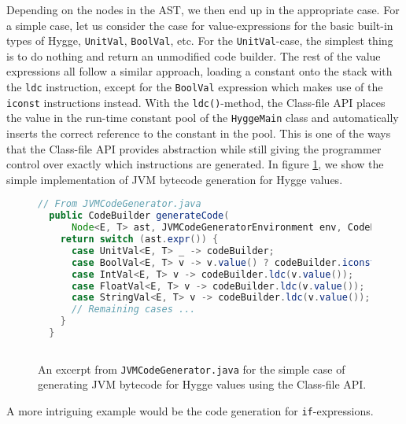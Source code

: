 Depending on the nodes in the AST, we then end up in the appropriate case. For a simple case, let us consider the case
for value-expressions for the basic built-in types of Hygge, \texttt{UnitVal}, \texttt{BoolVal}, etc. For the \texttt{UnitVal}-case,
the simplest thing is to do nothing and return an unmodified code builder. The rest of the value expressions all follow a similar approach,
loading a constant onto the stack with the \texttt{ldc} instruction, except for the \texttt{BoolVal} expression which makes use of the
\texttt{iconst} instructions instead. With the \texttt{ldc()}-method, the Class-file API places the value in the run-time constant pool
of the \texttt{HyggeMain} class and automatically inserts the correct reference to the constant in the pool. This is one of the ways
that the Class-file API provides abstraction while still giving the programmer control over exactly which instructions are generated.
In figure \ref{fig:jvm_value_codegen}, we show the
simple implementation of JVM bytecode generation for Hygge values.

\begin{figure}[H]
\centering
\begin{lstlisting}[language=Java]
  // From JVMCodeGenerator.java
  public CodeBuilder generateCode(
      Node<E, T> ast, JVMCodeGeneratorEnvironment env, CodeBuilder codeBuilder) {
    return switch (ast.expr()) {
      case UnitVal<E, T> _ -> codeBuilder;
      case BoolVal<E, T> v -> v.value() ? codeBuilder.iconst_1() : codeBuilder.iconst_0();
      case IntVal<E, T> v -> codeBuilder.ldc(v.value());
      case FloatVal<E, T> v -> codeBuilder.ldc(v.value());
      case StringVal<E, T> v -> codeBuilder.ldc(v.value());
      // Remaining cases ... 
    }
  }
 
\end{lstlisting}
\caption{An excerpt from \texttt{JVMCodeGenerator.java} for the simple case of generating JVM bytecode for Hygge values using the Class-file API.}
\label{fig:jvm_value_codegen}
\end{figure}

A more intriguing example would be the code generation for \texttt{if}-expressions.

